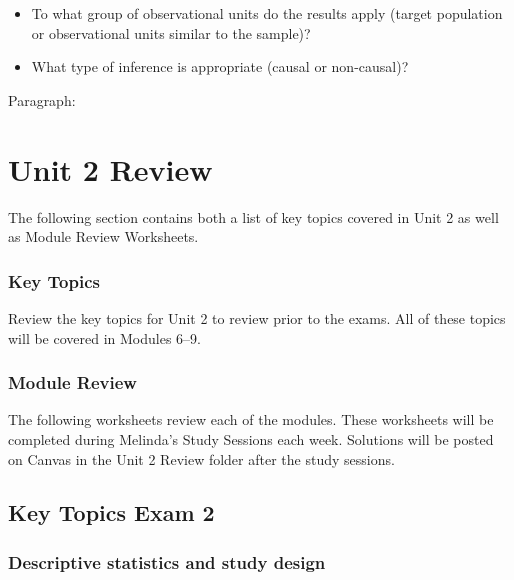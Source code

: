 \documentclass[
]{report}
\begin{document}
\begin{itemize}
  \begin{itemize}
  \item
    To what group of observational units do the results apply (target population or observational units similar to the sample)?
  \item
    What type of inference is appropriate (causal or non-causal)?
  \end{itemize}
\end{itemize}

Paragraph:

\newpage

\chapter{Unit 2 Review}\label{unit-2-review}

The following section contains both a list of key topics covered in Unit 2 as well as Module Review Worksheets.

\subsection{Key Topics}\label{key-topics-9}

Review the key topics for Unit 2 to review prior to the exams. All of these topics will be covered in Modules 6--9.

\subsection{Module Review}\label{module-review-1}


The following worksheets review each of the modules. These worksheets will be completed during Melinda's Study Sessions each week. Solutions will be posted on Canvas in the Unit 2 Review folder after the study sessions.

\newpage

\section{Key Topics Exam 2}\label{key-topics-exam-2}

\subsection*{Descriptive statistics and study design}\label{descriptive-statistics-and-study-design-1}
\end{document}
